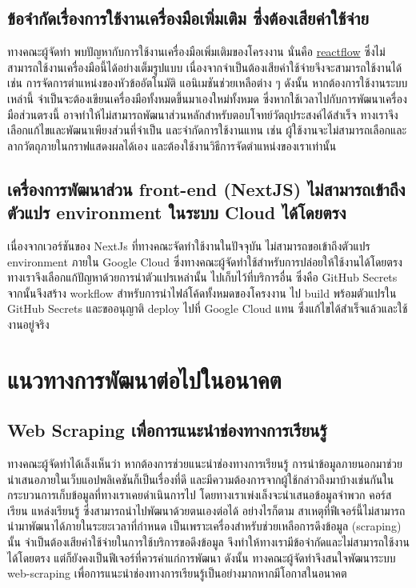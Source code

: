 \subsection{ข้อจำกัดเรื่องการใช้งานเครื่องมือเพิ่มเติม ซึ่งต้องเสียค่าใช้จ่าย}
\par{
    ทางคณะผู้จัดทำ พบปัญหากับการใช้งานเครื่องมือเพิ่มเติมของโครงงาน นั่นคือ \hyperref[subsec:reactflow]{reactflow} ซึ่งไม่สามารถใช้งานเครื่องมือนี้ได้อย่างเต็มรูปแบบ
    เนื่องจากจำเป็นต้องเสียค่าใช้จ่ายจึงจะสามารถใช้งานได้ เช่น การจัดการตำแหน่งของหัวข้ออัตโนมัติ แอนิเมชันช่วยเหลือต่าง ๆ ดังนั้น หากต้องการใช้งานระบบเหล่านี้ จำเป็นจะต้องเขียนเครื่องมือทั้งหมดขึ้นมาเองใหม่ทั้งหมด
    ซึ่งหากใช้เวลาไปกับการพัฒนาเครื่องมือส่วนตรงนี้ อาจทำให้ไม่สามารถพัฒนาส่วนหลักสำหรับตอบโจทย์วัตถุประสงค์ได้สำเร็จ ทางเราจึงเลือกแก้ไขและพัฒนาเพียงส่วนที่จำเป็น และจำกัดการใช้งานแทน
    เช่น ผู้ใช้งานจะไม่สามารถเลือกและลากวัตถุภายในกราฟแสดงผลได้เอง และต้องใช้งานวิธีการจัดตำแหน่งของเราเท่านั้น
}
\subsection{เครื่องการพัฒนาส่วน front-end (NextJS) ไม่สามารถเข้าถึงตัวแปร environment ในระบบ Cloud ได้โดยตรง}
\par{
    เนื่องจากเวอร์ชันของ NextJs ที่ทางคณะจัดทำใช้งานในปัจจุบัน ไม่สามารถขอเข้าถึงตัวแปร environment ภายใน Google Cloud ซึ่งทางคณะผู้จัดทำใช้สำหรับการปล่อยให้ใช้งานได้โดยตรง
    ทางเราจึงเลือกแก้ปัญหาด้วยการนำตัวแปรเหล่านั้น ไปเก็บไว้ที่บริการอื่น ซึ่งคือ GitHub Secrets จากนั้นจึงสร้าง workflow สำหรับการนำไฟล์โค้ดทั้งหมดของโครงงาน
    ไป build พร้อมตัวแปรใน GitHub Secrets และขออนุญาติ deploy ไปที่ Google Cloud แทน ซึ่งแก้ไขได้สำเร็จแล้วและใช้งานอยู่จริง
}

\section{แนวทางการพัฒนาต่อไปในอนาคต}
\subsection{Web Scraping เพื่อการแนะนำช่องทางการเรียนรู้}
\par{
    ทางคณะผู้จัดทำได้เล็งเห็นว่า หากต้องการช่วยแนะนำช่องทางการเรียนรู้ การนำข้อมูลภายนอกมาช่วยนำเสนอภายในเว็บแอปพลิเคชันก็เป็นเรื่องที่ดี และมีความต้องการจากผู้ใช้กล่าวถึงมาบ้างเช่นกันในกระบวนการเก็บข้อมูลที่ทางเราเคยดำเนินการไป
    โดยทางเราเพ่งเล็งจะนำเสนอข้อมูลจำพวก คอร์สเรียน แหล่งเรียนรู้ ซึ่งสามารถนำไปพัฒนาด้วยตนเองต่อได้ อย่างไรก็ตาม สาเหตุที่ฟีเจอร์นี้ไม่สามารถนำมาพัฒนาได้ภายในระยะเวลาที่กำหนด
    เป็นเพราะเครื่องสำหรับช่วยเหลือการดึงข้อมูล (scraping) นั้น จำเป็นต้องเสียค่าใช้จ่ายในการใช้บริการขอดึงข้อมูล จึงทำให้ทางเรามีข้อจำกัดและไม่สามารถใช้งานได้โดยตรง แต่ก็ยังคงเป็นฟีเจอร์ที่ควรค่าแก่การพัฒนา ดังนั้น
    ทางคณะผู้จัดทำจึงสนใจพัฒนาระบบ web-scraping เพื่อการแนะนำช่องทางการเรียนรู้เป็นอย่างมากหากมีโอกาสในอนาคต
}
